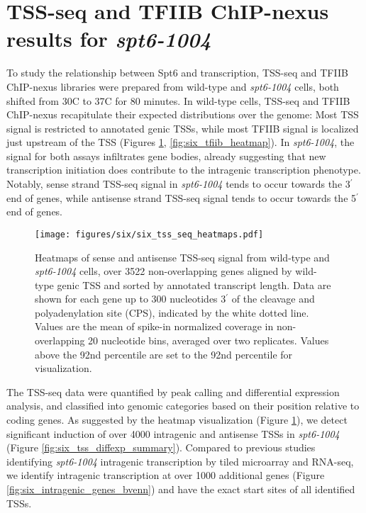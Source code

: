 \section{TSS-seq and TFIIB ChIP-nexus results for \textit{spt6-1004}}

To study the relationship between Spt6 and transcription, TSS-seq and TFIIB ChIP-nexus libraries were prepared from wild-type and \textit{spt6-1004} cells, both shifted from 30\textdegree C to 37\textdegree C for 80 minutes.
In wild-type cells, TSS-seq and TFIIB ChIP-nexus recapitulate their expected distributions over the genome: Most TSS signal is restricted to annotated genic TSSs, while most TFIIB signal is localized just upstream of the TSS (Figures \ref{fig:six_tss_seq_heatmaps}, \ref{fig:six_tfiib_heatmap}).
In \textit{spt6-1004}, the signal for both assays infiltrates gene bodies, already suggesting that new transcription initiation does contribute to the intragenic transcription phenotype.
Notably, sense strand TSS-seq signal in \textit{spt6-1004} tends to occur towards the 3$^\prime$ end of genes, while antisense strand TSS-seq signal tends to occur towards the 5$^\prime$ end of genes.

\begin{figure}[H]
\centering
\texttt{[image: figures/six/six\_tss\_seq\_heatmaps.pdf]}
\caption[Heatmaps of sense and antisense TSS-seq signal from wild-type and \textit{spt6-1004} cells, over non-overlapping coding genes.]{Heatmaps of sense and antisense TSS-seq signal from wild-type and \textit{spt6-1004} cells, over 3522 non-overlapping genes aligned by wild-type genic TSS and sorted by annotated transcript length. Data are shown for each gene up to 300 nucleotides 3$^\prime$ of the cleavage and polyadenylation site (CPS), indicated by the white dotted line. Values are the mean of spike-in normalized coverage in non-overlapping 20 nucleotide bins, averaged over two replicates. Values above the 92nd percentile are set to the 92nd percentile for visualization.}
\label{fig:six_tss_seq_heatmaps}
\end{figure}

The TSS-seq data were quantified by peak calling and differential expression analysis, and classified into genomic categories based on their position relative to coding genes.
As suggested by the heatmap visualization (Figure \ref{fig:six_tss_seq_heatmaps}), we detect significant induction of over 4000 intragenic and antisense TSSs in \textit{spt6-1004} (Figure \ref{fig:six_tss_diffexp_summary}).
Compared to previous studies identifying \textit{spt6-1004} intragenic transcription by tiled microarray and RNA-seq, we identify intragenic transcription at over 1000 additional genes (Figure \ref{fig:six_intragenic_genes_bvenn}) and have the exact start sites of all identified TSSs.

